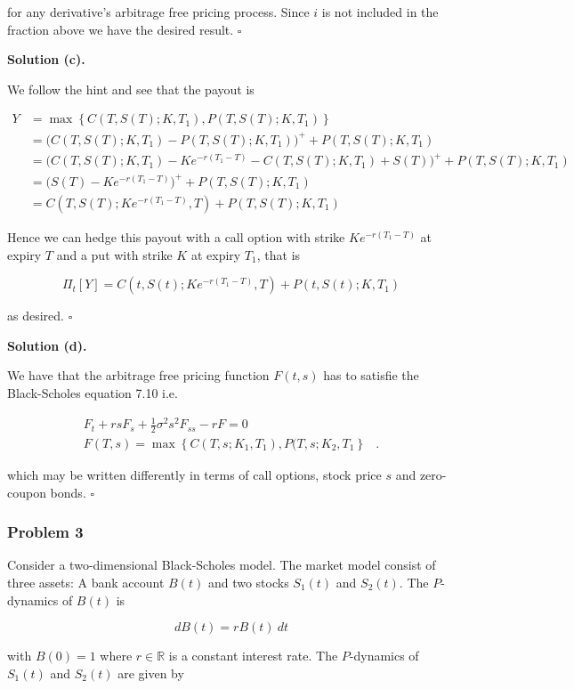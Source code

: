 \documentclass[
]{article}
\begin{document}
for any derivative's arbitrage free pricing process. Since \(i\) is not
included in the fraction above we have the desired result. \(\square\)

\textbf{Solution (c).}

We follow the hint and see that the payout is

\begin{align*}
Y&=\max\left\{C(T,S(T);K,T_1),P(T,S(T);K,T_1)\right\}\\
&=\Big(C(T,S(T);K,T_1)-P(T,S(T);K,T_1)\Big)^++P(T,S(T);K,T_1)\\
&=\Big(C(T,S(T);K,T_1)-Ke^{-r(T_1-T)}-C(T,S(T);K,T_1)+S(T)\Big)^++P(T,S(T);K,T_1)\\
&=\Big(S(T)-Ke^{-r(T_1-T)}\Big)^++P(T,S(T);K,T_1)\\
&=C(T,S(T);Ke^{-r(T_1-T)},T)+P(T,S(T);K,T_1)
\end{align*}

Hence we can hedge this payout with a call option with strike
\(Ke^{-r(T_1-T)}\) at expiry \(T\) and a put with strike \(K\) at expiry
\(T_1\), that is

\[
\Pi_t[Y]=C(t,S(t);Ke^{-r(T_1-T)},T)+P(t,S(t);K,T_1)
\]

as desired. \(\square\)

\textbf{Solution (d).}

We have that the arbitrage free pricing function \(F(t,s)\) has to
satisfie the Black-Scholes equation 7.10 i.e.

\begin{align*}
F_t+rsF_s+\frac{1}{2}\sigma ^2 s^2F_{ss}-rF=0&\\
F(T,s)=\max\left\{C(T,s;K_1,T_1),P(T,s;K_2,T_1\right\}&.
\end{align*}

which may be written differently in terms of call options, stock price
\(s\) and zero-coupon bonds. \(\square\)

\hypertarget{problem-3-2}{%
\subsubsection{Problem 3}\label{problem-3-2}}

Consider a two-dimensional Black-Scholes model. The market model consist
of three assets: A bank account \(B(t)\) and two stocks \(S_1(t)\) and
\(S_2(t)\). The \(P\)-dynamics of \(B(t)\) is

\[
dB(t)=rB(t)\ dt
\]

with \(B(0)=1\) where \(r\in\mathbb{R}\) is a constant interest rate.
The \(P\)-dynamics of \(S_1(t)\) and \(S_2(t)\) are given by
\end{document}
